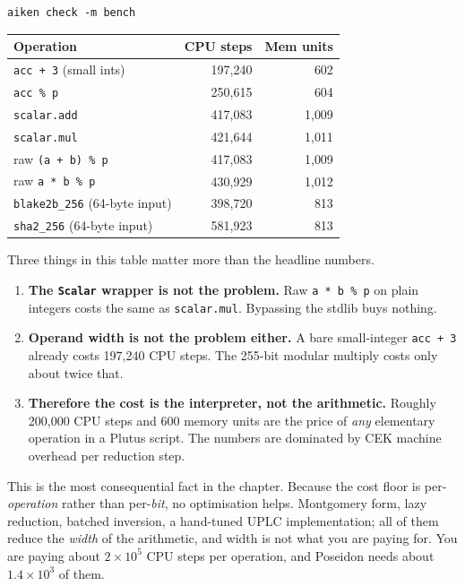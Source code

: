 \begin{verbatim}
aiken check -m bench
\end{verbatim}

\begin{center}
\begin{tabular}{lrr}
  \hline
  \textbf{Operation} & \textbf{CPU steps} & \textbf{Mem units} \\
  \hline
  \texttt{acc + 3} (small ints)          & 197{,}240 & 602 \\
  \texttt{acc \% p}                      & 250{,}615 & 604 \\
  \texttt{scalar.add}                    & 417{,}083 & 1{,}009 \\
  \texttt{scalar.mul}                    & 421{,}644 & 1{,}011 \\
  raw \texttt{(a + b) \% p}              & 417{,}083 & 1{,}009 \\
  raw \texttt{a * b \% p}                & 430{,}929 & 1{,}012 \\
  \hline
  \texttt{blake2b\_256} (64-byte input)  & 398{,}720 & 813 \\
  \texttt{sha2\_256} (64-byte input)     & 581{,}923 & 813 \\
  \hline
\end{tabular}
\end{center}

Three things in this table matter more than the headline numbers.

\begin{enumerate}
  \item \textbf{The \texttt{Scalar} wrapper is not the problem.} Raw
        \texttt{a * b \% p} on plain integers costs the same as
        \texttt{scalar.mul}. Bypassing the stdlib buys nothing.
  \item \textbf{Operand width is not the problem either.} A bare small-integer
        \texttt{acc + 3} already costs 197{,}240 CPU steps. The 255-bit modular
        multiply costs only about twice that.
  \item \textbf{Therefore the cost is the interpreter, not the arithmetic.}
        Roughly 200{,}000 CPU steps and 600 memory units are the price of
        \emph{any} elementary operation in a Plutus script. The numbers are
        dominated by CEK machine overhead per reduction step.
\end{enumerate}

\begin{highlight}
This is the most consequential fact in the chapter. Because the cost floor is
per-\emph{operation} rather than per-\emph{bit}, no optimisation helps.
Montgomery form, lazy reduction, batched inversion, a hand-tuned UPLC
implementation; all of them reduce the \emph{width} of the arithmetic, and
width is not what you are paying for. You are paying about $2 \times 10^5$ CPU
steps per operation, and Poseidon needs about $1.4 \times 10^3$ of them.
\end{highlight}

